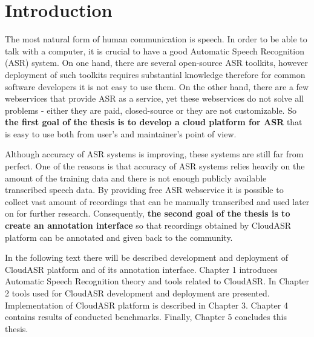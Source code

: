 \chapter*{Introduction}

The most natural form of human communication is speech.
In order to be able to talk with a computer,
  it is crucial to have a good Automatic Speech Recognition (ASR) system.
On one hand, there are several open-source ASR toolkits,
  however deployment of such toolkits requires substantial knowledge therefore
  for common software developers it is not easy to use them.
On the other hand, there are a few webservices that provide ASR as a service,
  yet these webservices do not solve all problems -
  either they are paid, closed-source or they are not customizable.
So \textbf{the first goal of the thesis is to develop a cloud platform for ASR}
  that is easy to use both from user's and maintainer's point of view.

Although accuracy of ASR systems is improving,
  these systems are still far from perfect.
One of the reasons is that accuracy of ASR systems relies heavily on the amount of the training data
  and there is not enough publicly available transcribed speech data.
By providing free ASR webservice it is possible to collect vast amount of recordings
  that can be manually transcribed and used later on for further research.
Consequently, \textbf{the second goal of the thesis is to create an annotation interface}
  so that recordings obtained by CloudASR platform can be annotated and given back to the community.

In the following text there will be described development and deployment of CloudASR platform and of its annotation interface.
Chapter 1 introduces Automatic Speech Recognition theory and tools related to CloudASR.
In Chapter 2 tools used for CloudASR development and deployment are presented.
Implementation of CloudASR platform is described in Chapter 3.
Chapter 4 contains results of conducted benchmarks.
Finally, Chapter 5 concludes this thesis.
